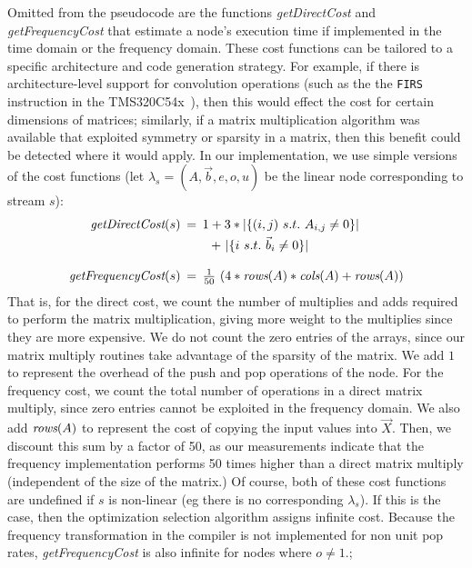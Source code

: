 Omitted from the pseudocode are the functions {\it getDirectCost} 
and {\it getFrequencyCost} that estimate a node's
execution time if implemented in the time domain or the frequency
domain.  These cost functions can be tailored to a specific
architecture and code generation strategy.  For example, if there is
architecture-level support for convolution operations (such as 
the the {\tt FIRS} instruction in the TMS320C54x~\cite{ti-dsp-manual}), 
then this would effect the cost for certain dimensions of matrices; similarly, if a
matrix multiplication algorithm was available that exploited symmetry
or sparsity in a matrix, then this benefit could be detected where it
would apply.  In our implementation, we use simple versions of the
cost functions (let $\lambda_s=(A,\vec{b},e,o,u)$ be the linear node
corresponding to stream $s$):
\[
\begin{array}{rcl}
\mt{getDirectCost}(s) \hspace{-6pt} & = \hspace{-6pt} & 1 + 3 * |\{ (i,j)~s.t.~A_{i,j} \ne 0\}| \vspace{3pt} \\ 
 ~ & ~ & \hspace{6.8pt}+~|\{ i~s.t.~{\vec b}_i \ne 0 \}| \\ ~ & ~ & ~ \\
\mt{getFrequencyCost}(s)  \hspace{-6pt} & = \hspace{-6pt} & \frac{1}{50}~(4 * \mt{rows}(A) * \mt{cols}(A) + \mt{rows}(A))
\end{array}
\]
That is, for the direct cost, we count the number of multiplies and
adds required to perform the matrix multiplication, giving more weight
to the multiplies since they are more expensive.  We do not count the
zero entries of the arrays, since our matrix multiply routines take
advantage of the sparsity of the matrix.  We add $1$ to represent
the overhead of the push and pop operations of the node.  For the
frequency cost, we count the total number of operations in a direct
matrix multiply, since zero entries cannot be exploited in the
frequency domain.  We also add $\mbox{\it rows}(A)$ to represent the 
cost of copying the input values into $\vec{X}$. Then, we discount this sum
by a factor of 50, as our measurements indicate that the frequency
implementation performs 50 times higher than a direct matrix multiply
(independent of the size of the matrix.)  Of course, both of these
cost functions are undefined if $s$ is non-linear (eg there is no
corresponding $\lambda_s$). If this is the case, then
the optimization selection algorithm assigns infinite cost.
Because the frequency transformation in the compiler is not implemented for
non unit pop rates, {\it getFrequencyCost} is also infinite 
for nodes where $o \ne 1$.; 


